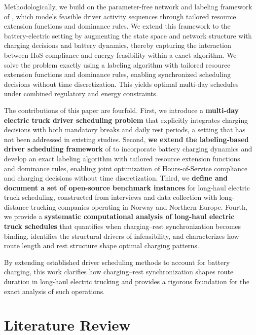 \documentclass[3p,11pt,authoryear]{elsarticle}  %
\begin{document}
    Methodologically, we build on the parameter-free network and labeling framework of \citet{goel2017exact}, which models feasible driver activity sequences through tailored resource extension functions and dominance rules. We extend this framework to the battery-electric setting by augmenting the state space and network structure with charging decisions and battery dynamics, thereby capturing the interaction between HoS compliance and energy feasibility within a exact algorithm. We solve the problem exactly using a labeling algorithm with tailored resource extension functions and dominance rules, enabling synchronized scheduling decisions without time discretization. This yields optimal multi-day schedules under combined regulatory and energy constraints.

    The contributions of this paper are fourfold. First, we introduce a \textbf{multi-day electric truck driver scheduling problem} that explicitly integrates charging decisions with both mandatory breaks and daily rest periods, a setting that has not been addressed in existing %
    studies. Second, \textbf{we extend the labeling-based driver scheduling framework} of \cite{goel2017exact} to incorporate battery charging dynamics and develop an exact labeling algorithm with tailored resource extension functions and dominance rules, enabling joint optimization of Hours-of-Service compliance and charging decisions without time discretization.
    Third, we \textbf{define and document a set of open-source benchmark instances} for long-haul electric truck scheduling, constructed from interviews and data collection with long-distance trucking companies operating in Norway and Northern Europe.
    Fourth, we provide a \textbf{systematic computational analysis of long-haul electric truck schedules} that quantifies when charging–rest synchronization becomes binding, identifies the structural drivers of infeasibility, and characterizes how route length and rest structure shape optimal charging patterns.

    By extending established driver scheduling methods to account for battery charging, this work clarifies how charging–rest synchronization shapes route duration in long-haul electric trucking and provides a rigorous foundation for the exact analysis of such operations.



\section{Literature Review}
\label{Literature Review}
\end{document}
